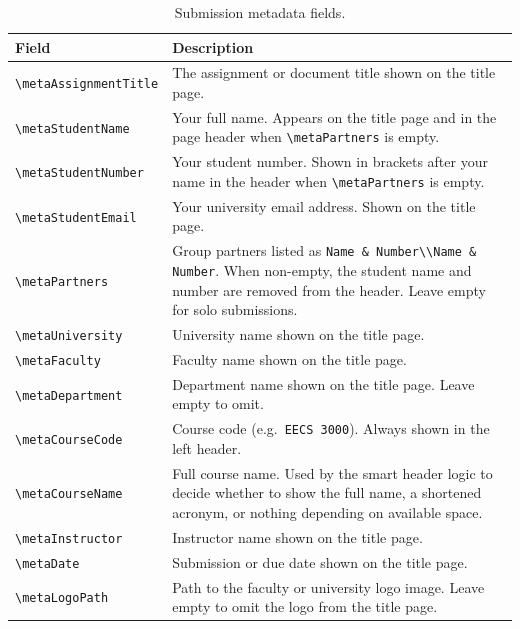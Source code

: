 \begin{table}[H]
	\centering
	\caption{Submission metadata fields.}
	\label{tab:meta-submission}
	\begin{tabularx}{\linewidth}{@{}lX@{}}
		\toprule
		Field & Description \\
		\midrule
		\texttt{\textbackslash metaAssignmentTitle} & The assignment or document title shown on the title page. \\
		\texttt{\textbackslash metaStudentName}     & Your full name. Appears on the title page and in the page header when \texttt{\textbackslash metaPartners} is empty. \\
		\texttt{\textbackslash metaStudentNumber}   & Your student number. Shown in brackets after your name in the header when \texttt{\textbackslash metaPartners} is empty. \\
		\texttt{\textbackslash metaStudentEmail}    & Your university email address. Shown on the title page. \\
		\texttt{\textbackslash metaPartners}        & Group partners listed as \texttt{Name \& Number\textbackslash\textbackslash Name \& Number}. When non-empty, the student name and number are removed from the header. Leave empty for solo submissions. \\
		\texttt{\textbackslash metaUniversity}      & University name shown on the title page. \\
		\texttt{\textbackslash metaFaculty}         & Faculty name shown on the title page. \\
		\texttt{\textbackslash metaDepartment}      & Department name shown on the title page. Leave empty to omit. \\
		\texttt{\textbackslash metaCourseCode}      & Course code (e.g.\ \texttt{EECS 3000}). Always shown in the left header. \\
		\texttt{\textbackslash metaCourseName}      & Full course name. Used by the smart header logic to decide whether to show the full name, a shortened acronym, or nothing depending on available space. \\
		\texttt{\textbackslash metaInstructor}      & Instructor name shown on the title page. \\
		\texttt{\textbackslash metaDate}            & Submission or due date shown on the title page. \\
		\texttt{\textbackslash metaLogoPath}        & Path to the faculty or university logo image. Leave empty to omit the logo from the title page. \\
		\bottomrule
	\end{tabularx}
\end{table}

